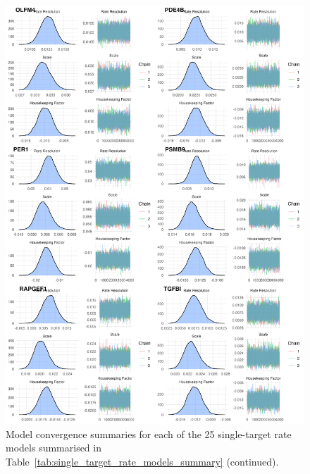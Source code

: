 \documentclass[../thesis.tex]{subfiles}
\begin{document}
\begin{figure}
    \centering
    \includegraphics[width=\textwidth]{figures/chapter2/model_summaries_8.png}
    \caption{Model convergence summaries for each of the 25 single-target rate models summarised in Table~\ref{tab:single_target_rate_models_summary} (continued).}
    \label{fig:convergence_8}
\end{figure}
\end{document}
